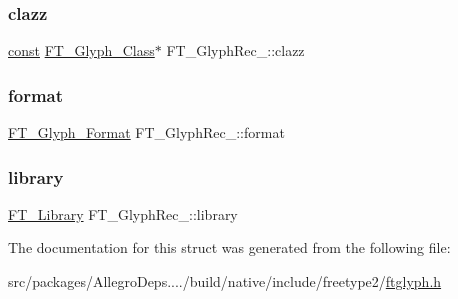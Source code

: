 \mbox{\label{struct_f_t___glyph_rec___ad7074cfe0e9fd6616e4dc4011e481524}} 
\subsubsection{\texorpdfstring{clazz}{clazz}}
{\footnotesize\ttfamily \hyperlink{zconf_8h_a2c212835823e3c54a8ab6d95c652660e}{const} \hyperlink{ftglyph_8h_ad05b3999d93247f41f1c4ac20ea0104b}{F\+T\+\_\+\+Glyph\+\_\+\+Class}$\ast$ F\+T\+\_\+\+Glyph\+Rec\+\_\+\+::clazz}

\mbox{\label{struct_f_t___glyph_rec___a26b42a2610a69dcaed3e7c8b6d506211}} 
\subsubsection{\texorpdfstring{format}{format}}
{\footnotesize\ttfamily \hyperlink{ftimage_8h_aeca0d10a27aedecbf96515e0628aff1f}{F\+T\+\_\+\+Glyph\+\_\+\+Format} F\+T\+\_\+\+Glyph\+Rec\+\_\+\+::format}

\mbox{\label{struct_f_t___glyph_rec___a00679b5e2519affab0f3999718817f8e}} 
\subsubsection{\texorpdfstring{library}{library}}
{\footnotesize\ttfamily \hyperlink{freetype_8h_a92857f8bf079b7b9ef5d3ce74cf89ef5}{F\+T\+\_\+\+Library} F\+T\+\_\+\+Glyph\+Rec\+\_\+\+::library}



The documentation for this struct was generated from the following file\+:\begin{DoxyCompactItemize}
\item 
src/packages/\+Allegro\+Deps..../build/native/include/freetype2/\hyperlink{ftglyph_8h}{ftglyph.\+h}\end{DoxyCompactItemize}
